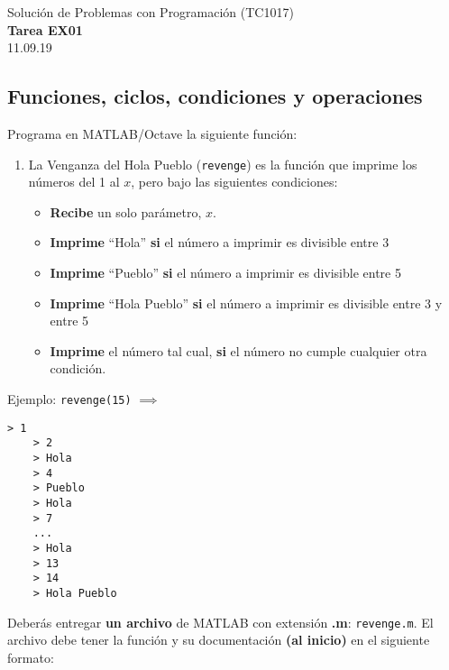 \documentclass[]{book}
\newcommand{\matlab}[1]{\lstinline[style=Matlab-pyglike]!#1!}
\theoremstyle{definition}
\begin{document}
\begin{center}
{\huge Solución de Problemas con Programación (TC1017)}\\[1.5ex]
{\large \textbf{Tarea EX01}\\[1.5ex] %
11.09.19} %
\end{center}

\vspace{0.2 cm}

\subsection*{Funciones, ciclos, condiciones y operaciones}

Programa en MATLAB/Octave la siguiente función:

\begin{enumerate}[label=\alph*)]
    \itemsep2.5ex
    \item La Venganza del Hola Pueblo (\matlab{revenge}) es la función que imprime los números del 1 al $x$, pero bajo las siguientes condiciones: 
    \begin{itemize}
        \item \textbf{Recibe} un solo parámetro, $x$.
        \item \textbf{Imprime} ``Hola'' \textbf{si} el número a imprimir es divisible entre 3
        \item \textbf{Imprime} ``Pueblo'' \textbf{si} el número a imprimir es divisible entre 5
        \item \textbf{Imprime} ``Hola Pueblo'' \textbf{si} el número a imprimir es divisible entre 3 y entre 5
        \item \textbf{Imprime} el número tal cual, \textbf{si} el número no cumple cualquier otra condición.
    \end{itemize}
\end{enumerate}

Ejemplo: \texttt{revenge(15)} $\implies$
\begin{lstlisting}[style=Matlab-editor]
    > 1
    > 2
    > Hola
    > 4
    > Pueblo
    > Hola
    > 7
    ...
    > Hola
    > 13
    > 14
    > Hola Pueblo
\end{lstlisting}

\bigskip

Deberás entregar \textbf{un archivo} de MATLAB con extensión \textbf{.m}: \texttt{revenge.m}.
El archivo debe tener la función y su documentación \textbf{(al inicio)} en el siguiente formato:
\end{document}
